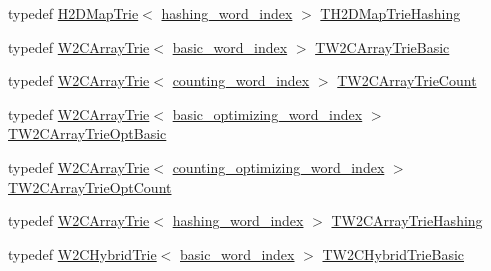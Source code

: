 \begin{DoxyCompactItemize}
\item 
typedef \hyperlink{classuva_1_1smt_1_1bpbd_1_1server_1_1lm_1_1_h2_d_map_trie}{H2\+D\+Map\+Trie}$<$ \hyperlink{classuva_1_1smt_1_1bpbd_1_1server_1_1lm_1_1dictionary_1_1hashing__word__index}{hashing\+\_\+word\+\_\+index} $>$ \hyperlink{namespaceuva_1_1smt_1_1bpbd_1_1server_1_1lm_a3498df199048e5874c448044fc4c3145}{T\+H2\+D\+Map\+Trie\+Hashing}
\item 
typedef \hyperlink{classuva_1_1smt_1_1bpbd_1_1server_1_1lm_1_1_w2_c_array_trie}{W2\+C\+Array\+Trie}$<$ \hyperlink{classuva_1_1smt_1_1bpbd_1_1server_1_1lm_1_1dictionary_1_1basic__word__index}{basic\+\_\+word\+\_\+index} $>$ \hyperlink{namespaceuva_1_1smt_1_1bpbd_1_1server_1_1lm_a8b676637a8584289b226487abf0a4156}{T\+W2\+C\+Array\+Trie\+Basic}
\item 
typedef \hyperlink{classuva_1_1smt_1_1bpbd_1_1server_1_1lm_1_1_w2_c_array_trie}{W2\+C\+Array\+Trie}$<$ \hyperlink{classuva_1_1smt_1_1bpbd_1_1server_1_1lm_1_1dictionary_1_1counting__word__index}{counting\+\_\+word\+\_\+index} $>$ \hyperlink{namespaceuva_1_1smt_1_1bpbd_1_1server_1_1lm_a1b693076361e3f43ba4d5ffd1e2f7036}{T\+W2\+C\+Array\+Trie\+Count}
\item 
typedef \hyperlink{classuva_1_1smt_1_1bpbd_1_1server_1_1lm_1_1_w2_c_array_trie}{W2\+C\+Array\+Trie}$<$ \hyperlink{namespaceuva_1_1smt_1_1bpbd_1_1server_1_1lm_1_1dictionary_a3001583c904eec702b4a4125082a7ecd}{basic\+\_\+optimizing\+\_\+word\+\_\+index} $>$ \hyperlink{namespaceuva_1_1smt_1_1bpbd_1_1server_1_1lm_a77ed7beadfafcc3c91c7ad86702e820e}{T\+W2\+C\+Array\+Trie\+Opt\+Basic}
\item 
typedef \hyperlink{classuva_1_1smt_1_1bpbd_1_1server_1_1lm_1_1_w2_c_array_trie}{W2\+C\+Array\+Trie}$<$ \hyperlink{namespaceuva_1_1smt_1_1bpbd_1_1server_1_1lm_1_1dictionary_a61cbd647b15de785ccf4cdd26661c366}{counting\+\_\+optimizing\+\_\+word\+\_\+index} $>$ \hyperlink{namespaceuva_1_1smt_1_1bpbd_1_1server_1_1lm_a9b401f3ea6f45b4bea89a9ae00067c64}{T\+W2\+C\+Array\+Trie\+Opt\+Count}
\item 
typedef \hyperlink{classuva_1_1smt_1_1bpbd_1_1server_1_1lm_1_1_w2_c_array_trie}{W2\+C\+Array\+Trie}$<$ \hyperlink{classuva_1_1smt_1_1bpbd_1_1server_1_1lm_1_1dictionary_1_1hashing__word__index}{hashing\+\_\+word\+\_\+index} $>$ \hyperlink{namespaceuva_1_1smt_1_1bpbd_1_1server_1_1lm_a74897a162a84aea39a51068c824cdba8}{T\+W2\+C\+Array\+Trie\+Hashing}
\item 
typedef \hyperlink{classuva_1_1smt_1_1bpbd_1_1server_1_1lm_1_1_w2_c_hybrid_trie}{W2\+C\+Hybrid\+Trie}$<$ \hyperlink{classuva_1_1smt_1_1bpbd_1_1server_1_1lm_1_1dictionary_1_1basic__word__index}{basic\+\_\+word\+\_\+index} $>$ \hyperlink{namespaceuva_1_1smt_1_1bpbd_1_1server_1_1lm_aefd4747976580c022cfcc90fb0d0c359}{T\+W2\+C\+Hybrid\+Trie\+Basic}

\end{DoxyCompactItemize}
